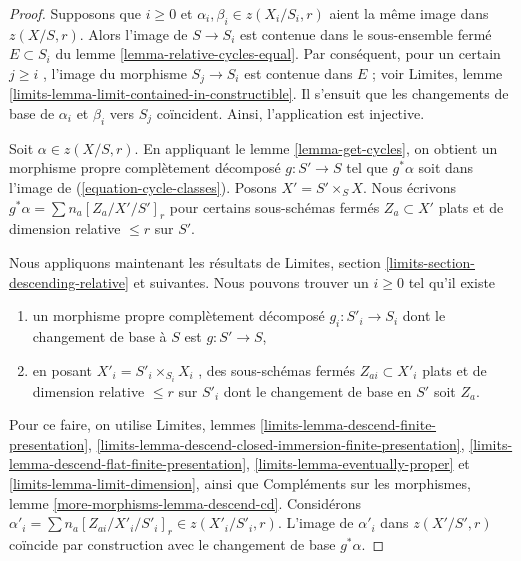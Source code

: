 \begin{proof} 
Supposons que  $i \geq 0$  et  $\alpha_i, \beta_i \in z(X_i/S_i, r)$
  aient la même image dans $z(X/S, r)$. Alors l'image de  $S \to S_i$
  est contenue dans le sous-ensemble fermé $E \subset S_i$  du
 lemme \ref{lemma-relative-cycles-equal}. Par conséquent,
 pour un certain  $j \geq i$ , l'image du morphisme  $S_j \to S_i$
  est contenue dans  $E$ ; voir Limites, lemme 
\ref{limits-lemma-limit-contained-in-constructible}. Il 
s'ensuit que les changements de base de  
$\alpha_i$  et $\beta_i$  vers  $S_j$  coïncident. Ainsi, l'application est injective. 

\medskip\noindent
 Soit  $\alpha \in z(X/S, r)$. En appliquant le lemme \ref{lemma-get-cycles}, on 
obtient un morphisme propre complètement décomposé  $g : S' \to S$  tel que  $g^*\alpha$
  soit dans l'image de (\ref{equation-cycle-classes}). 
Posons  $X' = S' \times_S X$. Nous écrivons  $g^*\alpha = \sum n_a [Z_a/X'/S']_r$
  pour certains sous-schémas fermés  $Z_a \subset X'$  plats et 
de dimension relative  $\leq r$  sur $S'$. 

\medskip\noindent
 Nous appliquons maintenant les résultats
 de Limites, section \ref{limits-section-descending-relative} et suivantes. Nous 
pouvons trouver un  $i \geq 0$  tel qu'il existe 
\begin{enumerate} 
\item un morphisme propre complètement décomposé  $g_i : S'_i \to S_i$
  dont le changement de base à  $S$  est  $g : S' \to S$, 
\item en posant  $X'_i = S'_i \times_{S_i} X_i$
 , des sous-schémas fermés  $Z_{ai} \subset X'_i$  plats et de
 dimension relative  $\leq r$  sur  $S'_i$  dont le changement de base en $S'$
  soit  $Z_a$. 
\end{enumerate} 
Pour ce faire, on utilise Limites, lemmes 
\ref{limits-lemma-descend-finite-presentation}, 
\ref{limits-lemma-descend-closed-immersion-finite-presentation}, 
\ref{limits-lemma-descend-flat-finite-presentation}, 
\ref{limits-lemma-eventually-proper} et 
\ref{limits-lemma-limit-dimension}, ainsi que
 Compléments sur les morphismes, lemme 
\ref{more-morphisms-lemma-descend-cd}. 
Considérons  
$\alpha'_i = \sum n_a [Z_{ai}/X'_i/S'_i]_r \in z(X'_i/S'_i, r)$.
 L'image de  $\alpha'_i$  dans  $z(X'/S', r)$ coïncide par construction avec le changement de base  
$g^*\alpha$. 


\end{proof}
